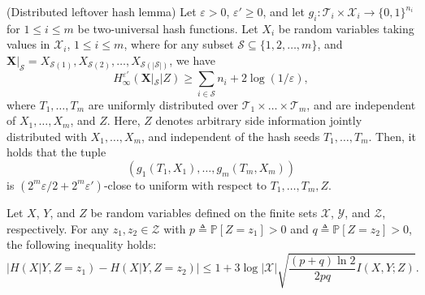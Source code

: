 \documentclass[runningheads]{llncs}
\newcommand{\parbreak}{ \vspace{0.3 em}}
\begin{document}
\begin{lemma} \cite{Winter1, Jurg} (Distributed leftover hash lemma)\label{DLHL}
    Let $\varepsilon > 0$, $\varepsilon' \geq 0$, and let $g_i: \mathcal{T}_i \times \mathcal{X}_i \to \{0, 1\}^{n_i}$ for $1 \leq i \leq m$ be two-universal hash functions. Let $X_i$ be random variables taking values in $\mathcal{X}_i$, $1 \leq i \leq m$, where for any subset $\mathcal{S} \subseteq \{1, 2, \dots, m\}$, and $\mathbf{X}|_\mathcal{S} = X_{\mathcal{S}(1)}, X_{\mathcal{S}(2)}, \dots, X_{\mathcal{S}(|\mathcal{S}|)}$, we have
\[
H_\infty^{\varepsilon'}(\mathbf{X}|_\mathcal{S} | Z) \geq \sum_{i \in \mathcal{S}} n_i + 2 \log(1/\varepsilon),
\]
where $T_1, \dots, T_m$ are uniformly distributed over $\mathcal{T}_1 \times \dots \times \mathcal{T}_m$, and are independent of $X_1, \dots, X_m$, and $Z$. Here, \(Z\) denotes arbitrary side information jointly distributed with \(X_1,\dots,X_m\), and independent of the hash seeds \(T_1,\dots,T_m\). Then, it holds that the tuple \[
(g_1(T_1, X_1), \dots, g_m(T_m, X_m))\] is $(2^m \varepsilon / 2 + 2^m \varepsilon')$-close to uniform with respect to $T_1, \dots, T_m, Z$.
\end{lemma}

\begin{lemma}\cite[Lemma 3]{Rudolf1}\label{lemma: Rudolf}
    Let $X$, $Y$, and $Z$ be random variables defined on the finite sets $\mathcal{X}$, $\mathcal{Y}$, and $\mathcal{Z}$, respectively. For any $z_1, z_2 \in \mathcal{Z}$ with $p \triangleq \mathbb{P}[Z = z_1] > 0$ and $q \triangleq \mathbb{P}[Z = z_2] > 0$, the following inequality holds:
\[
\left\lvert H(X | Y, Z = z_1) - H(X | Y, Z = z_2) \right\rvert \leq 1 + 3 \log |\mathcal{X}| \sqrt{\frac{(p + q) \ln 2}{2pq} I(X,Y; Z)}.
\]
\end{lemma}

\parbreak 
\end{document}
